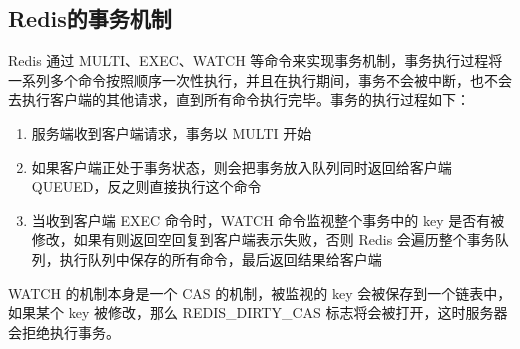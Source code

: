 \documentclass[../../../interview-questions.tex]{subfiles}
\begin{document}
\subsection{Redis的事务机制}

Redis 通过 MULTI、EXEC、WATCH 等命令来实现事务机制，事务执行过程将一系列多个命令按照顺序一次性执行，并且在执行期间，事务不会被中断，也不会去执行客户端的其他请求，直到所有命令执行完毕。事务的执行过程如下：

\begin{enumerate}
    \item {服务端收到客户端请求，事务以 MULTI 开始}
    \item {如果客户端正处于事务状态，则会把事务放入队列同时返回给客户端 QUEUED，反之则直接执行这个命令}
    \item {当收到客户端 EXEC 命令时，WATCH 命令监视整个事务中的 key 是否有被修改，如果有则返回空回复到客户端表示失败，否则 Redis 会遍历整个事务队列，执行队列中保存的所有命令，最后返回结果给客户端}
\end{enumerate}

WATCH 的机制本身是一个 CAS 的机制，被监视的 key 会被保存到一个链表中，如果某个 key 被修改，那么 REDIS\_DIRTY\_CAS 标志将会被打开，这时服务器会拒绝执行事务。
\end{document}
